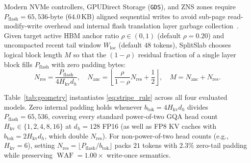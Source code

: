 \documentclass[final,5p,times,twocolumn]{elsarticle}
\theoremstyle{definition}
\theoremstyle{remark}
\newcommand{\SplitSlab}{\textup{\textsc{SplitSlab}}}
\newcommand{\WAF}{\operatorname{WAF}}
\def\SplitSlab{SplitSlab}%
\begin{document}
Modern NVMe controllers, GPUDirect Storage (\texttt{GDS}), and ZNS zones require $P_{\mathrm{flash}} = 65{,}536$-byte ($64.0$\,KB) aligned sequential writes to avoid sub-page read-modify-write overhead and internal flash translation layer garbage collection~\cite{hu2009waf,bjorling2021zns}. Given target active HBM anchor ratio $\rho \in (0,1)$ (default $\rho = 0.20$) and uncompacted recent tail window $W_{\mathrm{loc}}$ (default $48$ tokens), \SplitSlab{} chooses logical block length $M$ so that the $(1-\rho)$ residual fraction of a single layer block fills $P_{\mathrm{flash}}$ with zero padding bytes:
\begin{equation}\label{eq:stripe_rule}
N_{\mathrm{res}} = \frac{P_{\mathrm{flash}}}{4 H_{\mathrm{kv}} d_h}, \quad
N_{\mathrm{anc}} = \left\lfloor \frac{\rho}{1-\rho} N_{\mathrm{res}} + \frac{1}{2} \right\rfloor, \quad
M = N_{\mathrm{anc}} + N_{\mathrm{res}}.
\end{equation}

\begin{table}[!t]
\centering
\caption{Universal Zero-Padding $64.0$\,KB Stripe Geometry ($d_h = 128$, $\rho = 0.20$) and Measured Hardware Compute Windows}
\label{tab:geometry}
\footnotesize
\renewcommand{\arraystretch}{1.12}
\setlength{\tabcolsep}{3.5pt}
\end{table}

Table~\ref{tab:geometry} instantiates \eqref{eq:stripe_rule} across all four evaluated models. Zero internal padding holds whenever $b_{\mathrm{tok}} = 4 H_{\mathrm{kv}} d_h$ divides $P_{\mathrm{flash}} = 65{,}536$, covering every standard power-of-two GQA head count $H_{\mathrm{kv}} \in \{1, 2, 4, 8, 16\}$ at $d_h = 128$ FP16 (as well as FP8 KV caches with $b_{\mathrm{tok}} = 2 H_{\mathrm{kv}} d_h$, which double $N_{\mathrm{res}}$). For non-power-of-two head counts (e.g., $H_{\mathrm{kv}} = 6$), setting $N_{\mathrm{res}} = \lfloor P_{\mathrm{flash}} / b_{\mathrm{tok}} \rfloor$ packs $21$ tokens with $2.3\%$ zero-tail padding while preserving $\WAF = 1.00\times$ write-once semantics.
\end{document}
